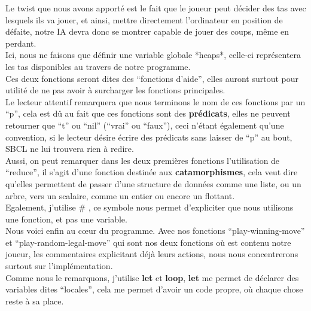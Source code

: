 \documentclass[a4paper, 12pt]{article}
\numberwithin{equation}{subsection}
\begin{document}
Le twist que nous avons apporté est le fait que le joueur peut décider des tas avec lesquels ils va jouer, et ainsi, mettre directement l'ordinateur en position de défaite, notre IA devra donc se montrer capable de jouer des coups, même en perdant. \\

Ici, nous ne faisons que définir une variable globale *heaps*, celle-ci représentera les tas disponibles au travers de notre programme. \\

Ces deux fonctions seront dites des ``fonctions d'aide'', elles auront surtout pour utilité de ne pas avoir à surcharger les fonctions principales. \\

Le lecteur attentif remarquera que nous terminons le nom de ces fonctions par un ``p'', cela est dû au fait que ces fonctions sont des {\bf prédicats}, elles ne peuvent retourner que ``t'' ou ``nil'' (``vrai'' ou ``faux''), ceci n'étant également qu'une convention, si le lecteur désire écrire des prédicats sans laisser de ``p'' au bout, SBCL ne lui trouvera rien à redire.\\

Aussi, on peut remarquer dans les deux premières fonctions l'utilisation de ``reduce'', il s'agit d'une fonction destinée aux {\bf catamorphismes}, cela veut dire qu'elles permettent de passer d'une structure de données comme une liste, ou un arbre, vers un scalaire, comme un entier ou encore un flottant. \\

Egalement, j'utilise \# , ce symbole nous permet d'expliciter que nous utilisons une fonction, et pas une variable.\\

Nous voici enfin au cœur du programme. Avec nos fonctions ``play-winning-move'' et ``play-random-legal-move'' qui sont nos deux fonctions où est contenu notre joueur, les commentaires explicitant déjà leurs actions, nous nous concentrerons surtout sur l'implémentation. \\

Comme nous le remarquons, j'utilise {\bf let} et {\bf loop}, {\bf let} me permet de déclarer des variables dites ``locales'', cela me permet d'avoir un code propre, où chaque chose reste à sa place. \\
\end{document}
